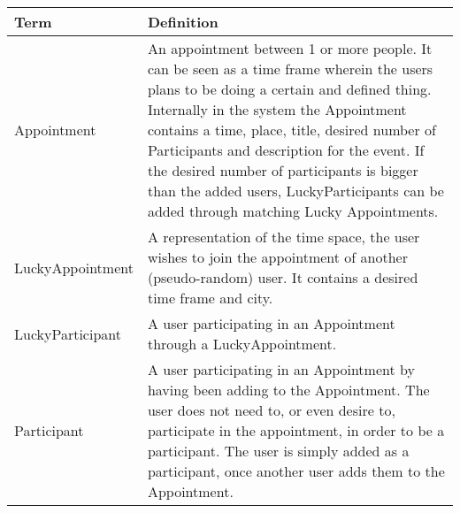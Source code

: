 {\tabulinesep=1.2mm
\begin{tabu}{ | p{3cm} | p{13cm} |}\hline
    Term		 			& 		Definition\\\hline
	Appointment				&		An appointment between 1 or more people. It can be seen as a time frame wherein the users plans to be doing a certain and defined thing. Internally in the system the Appointment contains a time, place, title, desired number of Participants and description for the event. If the desired number of participants is bigger than the added users, LuckyParticipants can be added through matching Lucky Appointments. \\\hline
	LuckyAppointment		&		A representation of the time space, the user wishes to join the appointment of another (pseudo-random) user. It contains a desired time frame and city.\\\hline
	LuckyParticipant		&		A user participating in an Appointment through a LuckyAppointment.\\\hline
	Participant 			&		A user participating in an Appointment by having been adding to the Appointment. The user does not need to, or even desire to, participate in the appointment, in order to be a participant. The user is simply added as a participant, once another user adds them to the Appointment. \\\hline
\end{tabu}
}